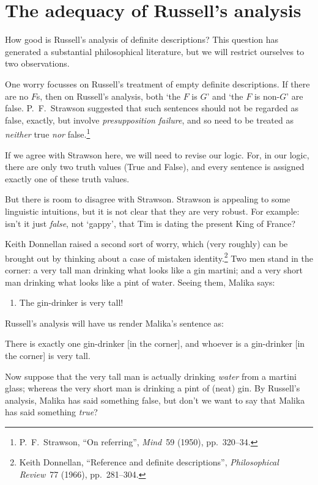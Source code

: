 \section{The adequacy of Russell's analysis}
How good is Russell's analysis of definite descriptions? This question has generated a substantial philosophical literature, but we will restrict ourselves to two observations.

One worry focusses on Russell's treatment of empty definite
descriptions. If there are no $F$s, then on Russell's analysis, both
`the $F$ is $G$' and  `the $F$ is non-$G$' are false. P.~F.\ Strawson
suggested that such sentences should not be regarded as false,
exactly, but involve \emph{presupposition failure}, and so need to be
treated as \emph{neither} true \emph{nor} false.\footnote{P.~F.\
Strawson, ``On referring'', \textit{Mind}~59 (1950), pp.\ 320--34.}

If we agree with Strawson here, we will need to revise our logic. For, in our logic, there are only two truth values (True and False), and every sentence is assigned exactly one of these truth values.

But there is room to disagree with Strawson. Strawson is appealing to some linguistic intuitions, but it is not clear that they are very robust. For example: isn't it just \emph{false}, not `gappy', that Tim is dating the present King of France?

Keith Donnellan raised a second sort of worry, which (very roughly)
can be brought out by thinking about a case of mistaken
identity.\footnote{Keith Donnellan, ``Reference and definite
descriptions'', \textit{Philosophical Review}~77 (1966), pp.\ 281--304.} Two
men stand in the corner: a very tall man drinking what looks like a
gin martini; and a very short man drinking what looks like a pint of
water. Seeing them, Malika says:
	\begin{enumerate}
		\item\label{gindrinker} The gin-drinker is very tall!
	\end{enumerate}
Russell's analysis will have us render Malika's sentence as:
	\begin{compactlist}
		\item[\ref*{gindrinker}$'$.] There is exactly one gin-drinker [in the corner], and whoever is a gin-drinker [in the corner] is very tall.
	\end{compactlist}
Now suppose that the very tall man is actually drinking \emph{water} from a martini glass; whereas the very short man is drinking a pint of (neat) gin. By Russell's analysis, Malika has said something false, but don't we want to say that Malika has said something \emph{true}? 


